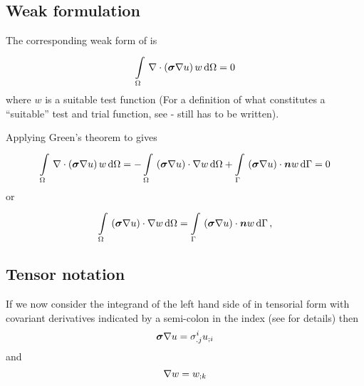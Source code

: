 \subsection{Weak formulation}

The corresponding weak form of  is
\begin{equation}
  \gint{\Omega}{}{\divergence{}{\pbrac{\conductivitytensor\gradient{}{u}}}w}{\Omega}=0 
  \label{eqn:LaplaceWeakForm}
\end{equation}
where $w$ is a suitable test function (For a definition of what constitutes a
``suitable'' test and trial function, see \secref{} - still has to be written).

Applying Green's theorem to  gives
\begin{equation}
 \gint{\Omega}{}{\divergence{}{\pbrac{\conductivitytensor\gradient{}{u}}}w}{\Omega}
 = -\gint{\Omega}{}{\dotprod{\pbrac{\conductivitytensor\gradient{}{u}}}{\gradient{}{w}}}{\Omega}
   +\gint{\Gamma}{}{\dotprod{\pbrac{\conductivitytensor\gradient{}{u}}}{\normal}w}{\Gamma}
 = 0
\end{equation}
or
\begin{equation}
  \gint{\Omega}{}{\dotprod{\pbrac{\conductivitytensor\gradient{}{u}}}{\gradient{}{w}}}{\Omega}
  = \gint{\Gamma}{}{\dotprod{\pbrac{\conductivitytensor\gradient{}{u}}}{\normal}w}{\Gamma} \,,
  \label{eqn:LaplaceWeightedResidualForm}
\end{equation}

\subsection{Tensor notation}

If we now consider the integrand of the left hand side of
 in tensorial form with covariant
derivatives indicated by a semi-colon in the index
(see  for details) then
\begin{equation}
  \conductivitytensor\gradient{}{u} = \conductivitytensorsymbol^{i}_{.j}\covarderiv{u}{i}
  \label{eqn:LaplaceWeakFormFactor1}
\end{equation}
and
\begin{equation}
  \gradient{}{w} = \covarderiv{w}{k}
  \label{eqn:LaplaceWeakFormFactor2}
\end{equation}

